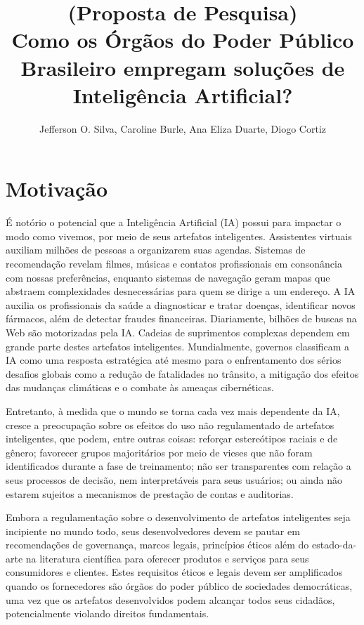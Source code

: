 \documentclass[12pt]{article}
\title{(Proposta de Pesquisa) \\ Como os Órgãos do Poder Público Brasileiro empregam soluções de Inteligência Artificial?}
\author{Jefferson O. Silva\inst{1}, Caroline Burle\inst{1}, Ana Eliza Duarte\inst{1}, Diogo Cortiz\inst{1} }
\begin{document}
\maketitle






\section{Motivação}

É notório o potencial que a Inteligência Artificial (IA) possui para impactar o modo como vivemos, por meio de seus artefatos inteligentes. Assistentes virtuais auxiliam milhões de pessoas a organizarem suas agendas. Sistemas de recomendação revelam filmes, músicas e contatos profissionais em consonância com nossas preferências, enquanto sistemas de navegação geram mapas que abstraem complexidades desnecessárias para quem se dirige a um endereço. A IA auxilia os profissionais da saúde a diagnosticar e tratar doenças, identificar novos fármacos, além de detectar fraudes financeiras. Diariamente, bilhões de buscas na Web são motorizadas pela IA. Cadeias de suprimentos complexas dependem em grande parte destes artefatos inteligentes. Mundialmente, governos classificam a IA como uma resposta estratégica até mesmo para o enfrentamento dos sérios desafios globais como a redução de fatalidades no trânsito, a mitigação dos efeitos das mudanças climáticas e o combate às ameaças cibernéticas.

Entretanto, à medida que o mundo se torna cada vez mais dependente da IA, cresce a preocupação sobre os efeitos do uso não regulamentado de artefatos inteligentes, que podem, entre outras coisas: reforçar estereótipos raciais e de gênero; favorecer grupos majoritários por meio de vieses que não foram identificados durante a fase de treinamento; não ser transparentes com relação a seus processos de decisão, nem interpretáveis para seus usuários; ou ainda não estarem sujeitos a mecanismos de prestação de contas e auditorias.

Embora a regulamentação sobre o desenvolvimento de artefatos inteligentes seja incipiente no mundo todo, seus desenvolvedores devem se pautar em recomendações de governança, marcos legais, princípios éticos além do estado-da-arte na literatura científica para oferecer produtos e serviços para seus consumidores e clientes. Estes requisitos éticos e legais devem ser amplificados quando os fornecedores são órgãos do poder público de sociedades democráticas, uma vez que os artefatos desenvolvidos podem alcançar todos seus cidadãos, potencialmente violando direitos fundamentais.
\end{document}

